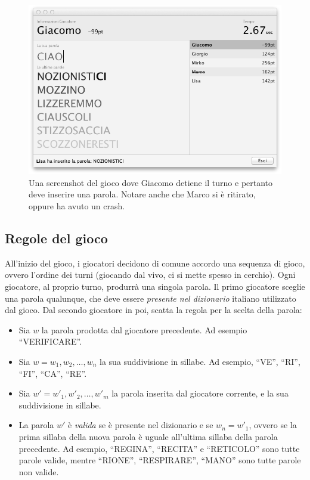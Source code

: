 \documentclass[10.5pt]{article}
\begin{document}
\begin{figure}
	\begin{center}
		\includegraphics[scale=0.5]{imgs/screenshot.png}
		\caption{Una screenshot del gioco dove Giacomo detiene il turno e pertanto deve inserire una parola. Notare anche che Marco si è ritirato, oppure ha avuto un crash.}
	\end{center}
\end{figure}


\subsection{Regole del gioco}
All'inizio del gioco, i giocatori decidono di comune accordo una sequenza di gioco, ovvero l'ordine dei turni (giocando dal vivo, ci si mette spesso in cerchio). Ogni giocatore, al proprio turno, produrrà una singola parola. Il primo giocatore sceglie una parola qualunque, che deve essere \emph{presente nel dizionario} italiano utilizzato dal gioco. Dal secondo giocatore in poi, scatta la regola per la scelta della parola:

\begin{itemize}
\item Sia $w$ la parola prodotta dal giocatore precedente. Ad esempio ``VERIFICARE''.
\item Sia $w=w_1, w_2, \dots, w_n$ la sua suddivisione in sillabe. Ad esempio, ``VE'', ``RI'', ``FI'', ``CA'', ``RE''.
\item Sia $w'=w'_1, w'_2, \dots, w'_m$ la parola inserita dal giocatore corrente, e la sua suddivisione in sillabe.
\item La parola $w'$ è \emph{valida} se è presente nel dizionario e se $w_n = w'_1$, ovvero se la prima sillaba della nuova parola è uguale all'ultima sillaba della parola precedente. Ad esempio, ``REGINA'', ``RECITA'' e ``RETICOLO'' sono tutte parole valide, mentre ``RIONE'', ``RESPIRARE'', ``MANO'' sono tutte parole non valide.
\end{itemize}
\end{document}
